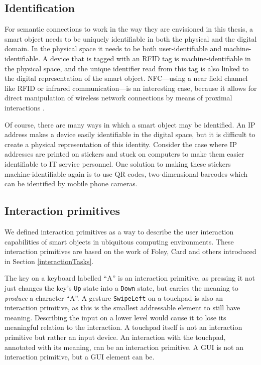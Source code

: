 \subsection{Identification}
\label{Identification}
For semantic connections to work in the way they are envisioned in this thesis, a smart object needs to be uniquely identifiable in both the physical and the digital domain. In the physical space it needs to be both user-identifiable and machine-identifiable. A device that is tagged with an \ac{RFID} tag is machine-identifiable in the physical space, and the unique identifier read from this tag is also linked to the digital representation of the smart object. \ac{NFC}---using a near field channel like \ac{RFID} or infrared communication---is an interesting case, because it allows for direct manipulation of wireless network connections by means of proximal interactions \cite{Rekimoto2003}.

Of course, there are many ways in which a smart object may be identified. An IP address makes a device easily identifiable in the digital space, but it is difficult to create a physical representation of this identity. Consider the case where IP addresses are printed on stickers and stuck on computers to make them easier identifiable to IT service personnel. One solution to making these stickers machine-identifiable again is to use \ac{QR} codes, two-dimensional barcodes which can be identified by mobile phone cameras.

\subsection{Interaction primitives}
\label{InteractionPrimitives}

We defined interaction primitives as a way to describe the user interaction capabilities of smart objects in ubiquitous computing environments.  These interaction primitives are based on the work of Foley, Card and others introduced in Section \ref{interactionTasks}.

The key on a keyboard labelled ``A'' is an interaction primitive, as pressing it not just changes the key's \texttt{Up} state into a \texttt{Down} state, but carries the meaning to \emph{produce} a character ``A''. A gesture \texttt{SwipeLeft} on a touchpad is also an interaction primitive, as this is the smallest addressable element to still have meaning. Describing the input on a lower level would cause it to lose its meaningful relation to the interaction. A touchpad itself is not an interaction primitive but rather an input device. An interaction with the touchpad, annotated with its meaning, can be an interaction primitive. A \ac{GUI} is not an interaction primitive, but a \ac{GUI} element can be.

